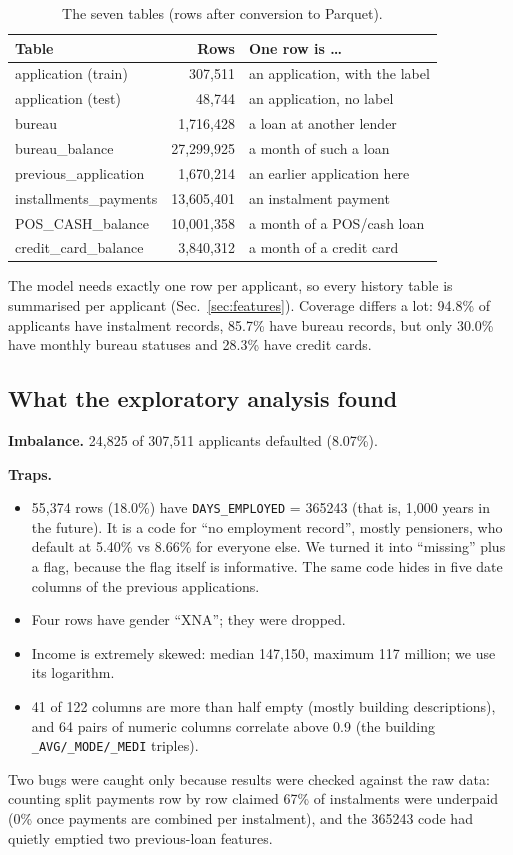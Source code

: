 \documentclass[conference,10pt]{IEEEtran}
\begin{document}
\begin{table}[h]
\centering\small
\caption{The seven tables (rows after conversion to Parquet).}
\label{tab:tables}
\footnotesize\setlength{\tabcolsep}{3pt}
\begin{tabular}{@{}lrl@{}}
\toprule
Table & Rows & One row is \ldots \\
\midrule
application (train) & 307,511 & an application, with the label \\
application (test) & 48,744 & an application, no label \\
bureau & 1,716,428 & a loan at another lender \\
bureau\_balance & 27,299,925 & a month of such a loan \\
previous\_application & 1,670,214 & an earlier application here \\
installments\_payments & 13,605,401 & an instalment payment \\
POS\_CASH\_balance & 10,001,358 & a month of a POS/cash loan \\
credit\_card\_balance & 3,840,312 & a month of a credit card \\
\bottomrule
\end{tabular}
\end{table}

The model needs exactly one row per applicant, so every history table is summarised per
applicant (Sec.~\ref{sec:features}). Coverage differs a lot: 94.8\% of applicants have
instalment records, 85.7\% have bureau records, but only 30.0\% have monthly bureau statuses and
28.3\% have credit cards.

\subsection{What the exploratory analysis found}
\textbf{Imbalance.} 24,825 of 307,511 applicants defaulted (8.07\%).

\textbf{Traps.}
\begin{itemize}
\item 55,374 rows (18.0\%) have \texttt{DAYS\_EMPLOYED} = 365243 (that is, 1,000 years in the
future). It is a code for ``no employment record'', mostly pensioners, who default at 5.40\% vs
8.66\% for everyone else. We turned it into ``missing'' plus a flag, because the flag itself is
informative. The same code hides in five date columns of the previous applications.
\item Four rows have gender ``XNA''; they were dropped.
\item Income is extremely skewed: median 147,150, maximum 117 million; we use its logarithm.
\item 41 of 122 columns are more than half empty (mostly building descriptions), and 64 pairs of
numeric columns correlate above 0.9 (the building \texttt{\_AVG/\_MODE/\_MEDI} triples).
\end{itemize}
Two bugs were caught only because results were checked against the raw data: counting split
payments row by row claimed 67\% of instalments were underpaid (0\% once payments are combined
per instalment), and the 365243 code had quietly emptied two previous-loan features.
\end{document}
